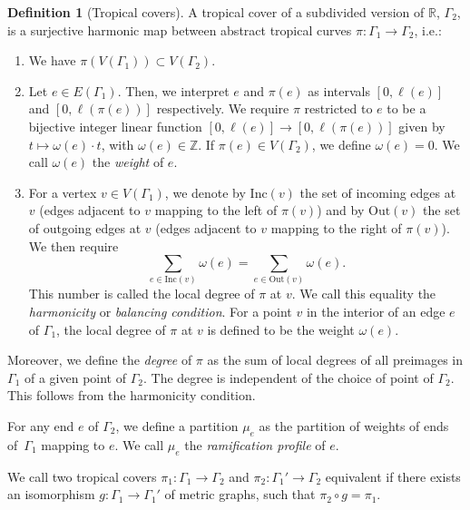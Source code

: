 \documentclass[10pt]{amsart}
\theoremstyle{plain}
\theoremstyle{definition}
\newtheorem{defi}[defi]{Definition}
\theoremstyle{definition}
\theoremstyle{plain}
\theoremstyle{plain}
\theoremstyle{remark}
\theoremstyle{plain}
\theoremstyle{plain}
\begin{document}
\begin{defi}[Tropical covers]
A tropical cover of a subdivided version of $\mathbb{R}$, $\Gamma_2$, is a surjective harmonic map between abstract tropical curves $\pi\colon \Gamma_1\to\Gamma_2$, i.e.:
\begin{enumerate}
    \item We have $\pi(V(\Gamma_1))\subset V(\Gamma_2)$.
    \item Let $e\in E(\Gamma_1)$. Then, we interpret $e$ and $\pi(e)$ as intervals $[0,\ell(e)]$ and $[0,\ell(\pi(e))]$ respectively. We require $\pi$ restricted to $e$ to be a bijective integer linear function $[0,\ell(e)]\to[0,\ell(\pi(e))]$ given by $t\mapsto \omega(e)\cdot t$, with $\omega(e) \in \mathbb{Z}$. If $\pi(e)\in V(\Gamma_2)$, we define $\omega(e)=0$. We call $\omega(e)$ the \textit{weight} of $e$.
    \item For a vertex $v\in V(\Gamma_1)$, we denote by $\mathrm{Inc}(v)$ the set of incoming edges at $v$ (edges adjacent to $v$ mapping to the left of $\pi(v)$) and by $\mathrm{Out}(v)$ the set of outgoing edges at $v$ (edges adjacent to $v$ mapping to the right of $\pi(v)$). We then require
    \begin{equation*}
            \sum_{e\in\mathrm{Inc}(v)}\omega(e)=\sum_{e\in\mathrm{Out}(v)}\omega(e).
    \end{equation*}
    This number is called the local degree of $\pi$ at $v$.
    We call this equality the \textit{harmonicity} or \textit{balancing condition}.
    For a point $v$ in the interior of an edge $e$ of $\Gamma_1$, the local degree of $\pi$ at $v$ is defined to be the weight $\omega(e)$.
\end{enumerate}
Moreover, we define the \textit{degree} of $\pi$ as the sum of local degrees of all preimages in $\Gamma_1$ of a given point of $\Gamma_2$. The degree is independent of the choice of point of $\Gamma_2$. This follows from the harmonicity condition.

For any end $e$ of $\Gamma_2$, we define a partition $\mu_e$ as the partition of weights of ends of~$\Gamma_1$ mapping to $e$. We call $\mu_e$ the \textit{ramification profile} of $e$.

We call two tropical covers $\pi_1\colon\Gamma_1\to\Gamma_2$ and $\pi_2\colon\Gamma_1'\to\Gamma_2$ equivalent if there exists an isomorphism $g\colon\Gamma_1\to\Gamma_1'$ of metric graphs, such that $\pi_2\circ g=\pi_1$.
\end{defi}
\end{document}
